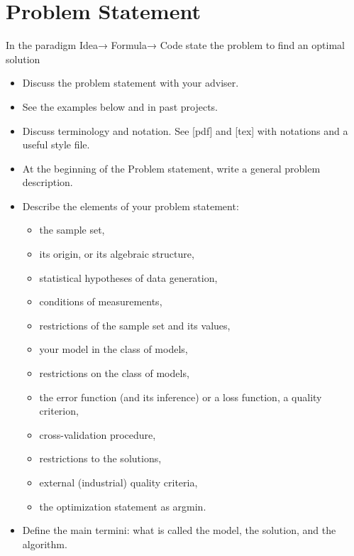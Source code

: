 \chapter{Problem Statement}
\label{sec:Chapter1} 

In the paradigm Idea→ Formula→ Code state the problem to find an optimal solution
\begin{itemize}
    \item Discuss the problem statement with your adviser.
    \item See the examples below and in past projects.
    \item Discuss terminology and notation. See [pdf] and [tex] with notations and a useful style file.
    \item At the beginning of the Problem statement, write a general problem description.
    \item Describe the elements of your problem statement:
    \begin{itemize}
        \item the sample set,
        \item its origin, or its algebraic structure,
        \item statistical hypotheses of data generation,
        \item conditions of measurements,
        \item restrictions of the sample set and its values,
        \item your model in the class of models,
        \item restrictions on the class of models,
        \item the error function (and its inference) or a loss function, a quality criterion,
        \item cross-validation procedure,
        \item restrictions to the solutions,
        \item external (industrial) quality criteria,
        \item the optimization statement as argmin.
    \end{itemize}
    \item Define the main termini: what is called the model, the solution, and the algorithm.
\end{itemize}

\hrulefill

